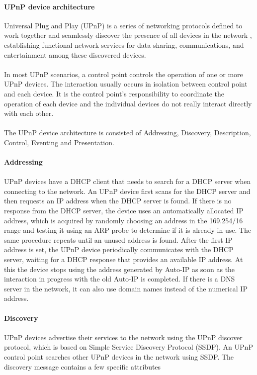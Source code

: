 \paragraph{UPnP device architecture\label{2_2_1_1}}
Universal Plug and Play (UPnP) is a series of networking protocols defined to 
work together and seamlessly discover the presence of all devices in the network 
, establishing functional network services for data sharing, communications, and 
entertainment among these discovered devices.\\
\\ 
In most UPnP scenarios, a control point controls the operation of one or more 
UPnP devices. The interaction usually occurs in isolation between control point 
and each device. It is the control point's responsibility to coordinate the operation of 
each device and the individual devices do not really interact directly with each other. \\
\\
The UPnP device architecture \cite{upnp} \label{upnp} \label{upnpdevice} 
is consisted of Addressing, Discovery, Description, Control, Eventing and
Presentation.\\
\\
\textbf{Addressing} \\ 
\\
UPnP devices have a DHCP client that needs to search for a DHCP server when
connecting to the network. An UPnP device first scans for the DHCP server and
then requests an IP address when the DHCP server is found. If there is no response from the DHCP server, the device uses an automatically allocated IP address, which is acquired by randomly choosing an address in the 169.254/16 range and testing it using an ARP probe to determine if it is already in use. The same procedure repeats until an unused address is found. After the first IP address is set, the UPnP device periodically communicates with the DHCP server, waiting for a DHCP response that provides an available IP address. At this the device stops using the address generated by Auto-IP as soon as the interaction in progress with the old Auto-IP is completed. If there is a DNS server in the network, it can also use domain names instead of the numerical IP address.\\
\\ 
\textbf{Discovery} \\ 
\\
UPnP devices advertise their services to the network using the UPnP discover protocol, which is based on 
Simple Service Discovery Protocol (SSDP). An UPnP control point searches other UPnP devices in the network using SSDP. The discovery message contains a few specific attributes 
